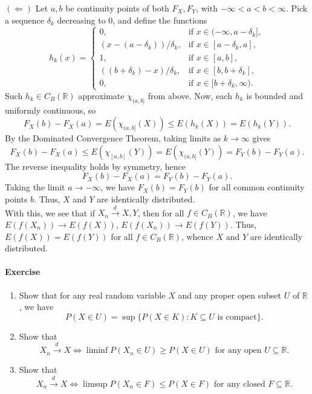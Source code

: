 \documentclass[10pt]{article}
\newcounter{prob}
\newcommand{\problem}{\stepcounter{prob}\paragraph{Exercise \arabic{prob}}}
\newcommand{\R}{\mathbb{R}}
\newcommand{\tod}{\overset{d\,}{\longrightarrow}}
\begin{document}
    $(\Leftarrow)$ Let $a, b$ be continuity points of both $F_X, F_Y$, with $-\infty
    < a < b < \infty$. Pick a sequence $\delta_k$ decreasing to $0$, and define the
    functions \[
        h_k(x) = \begin{cases}
            0,  &\text{if } x \in (-\infty, a - \delta_k], \\
            (x - (a - \delta_k)) / \delta_k,
                &\text{if } x \in [a - \delta_k, a], \\
            1,  &\text{if } x \in [a, b], \\
            ((b + \delta_k) - x) / \delta_k,
                &\text{if } x \in [b, b + \delta_k], \\
            0,  &\text{if } x \in [b + \delta_k, \infty).
        \end{cases}
    \] Such $h_k \in C_B(\R)$ approximate $\chi_{(a, b]}$ from above. Now, each $h_k$
    is bounded and uniformly continuous, so \[
        F_X(b) - F_X(a) = E(\chi_{(a, b]}(X)) \leq E(h_k(X)) = E(h_k(Y)).
    \] By the Dominated Convergence Theorem, taking limits as $k \to \infty$ gives
    \[
        F_X(b) - F_X(a) \leq E(\chi_{[a, b]}(Y)) = E(\chi_{(a, b]}(Y)) = F_Y(b) -
        F_Y(a).
    \] The reverse inequality holds by symmetry, hence \[
        F_X(b) - F_X(a) = F_Y(b) - F_Y(a).
    \] Taking the limit $a \to -\infty$, we have $F_X(b) = F_Y(b)$ for all common
    continuity points $b$. Thus, $X$ and $Y$ are identically distributed. \\

    With this, we see that if $X_n \tod X, Y$, then for all $f \in C_B(\R)$, we have
    $E(f(X_n)) \to E(f(X))$, $E(f(X_n)) \to E(f(Y))$. Thus, $E(f(X)) = E(f(Y))$ for
    all $f \in C_B(\R)$, whence $X$ and $Y$ are identically distributed.


    \problem \begin{enumerate}
        \item Show that for any real random variable $X$ and any proper open subset
        $U$ of $\R$, we have \[
            P(X \in U) = \sup \{P(X \in K) : K \subseteq U \text{ is compact}\}.
        \]

        \item Show that \[
            X_n \tod X \iff \liminf P(X_n \in U) \geq P(X \in U) \text{ for any open
            } U \subseteq \R.
        \]

        \item Show that \[
            X_n \tod X \iff \limsup P(X_n \in F) \leq P(X \in F) \text{ for any
            closed } F \subseteq \R.
        \]
    \end{enumerate}
\end{document}
